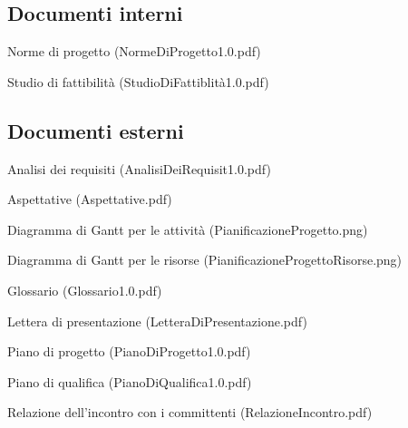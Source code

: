 \subsection{Documenti interni}
\begin{list}{-}{}
\item Norme di progetto (NormeDiProgetto1.0.pdf)
\item Studio di fattibilit\`a (StudioDiFattiblit\`a1.0.pdf)
\end{list}
\subsection{Documenti esterni}
\begin{list}{-}{}
\item Analisi dei requisiti (AnalisiDeiRequisit1.0.pdf)
\item Aspettative (Aspettative.pdf)
\item Diagramma di Gantt per le attivit\`a (PianificazioneProgetto.png)
\item Diagramma di Gantt per le risorse (PianificazioneProgettoRisorse.png)
\item Glossario (Glossario1.0.pdf)
\item Lettera di presentazione (LetteraDiPresentazione.pdf)
\item Piano di progetto (PianoDiProgetto1.0.pdf)
\item Piano di qualifica (PianoDiQualifica1.0.pdf)
\item Relazione dell'incontro con i committenti (RelazioneIncontro.pdf)
\end{list}


